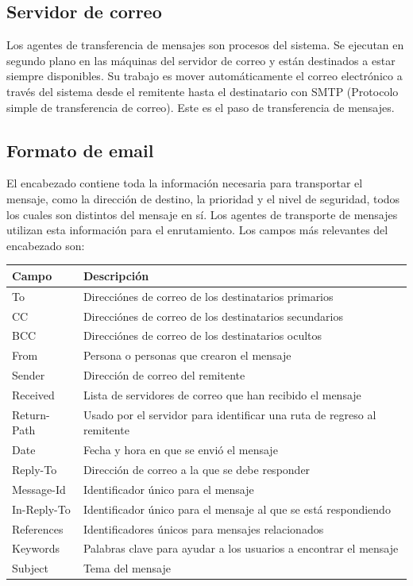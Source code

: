 \subsection{Servidor de correo}
Los agentes de transferencia de mensajes son procesos del sistema. Se ejecutan en segundo plano en las máquinas del servidor de correo y están destinados a estar siempre disponibles. Su trabajo es mover automáticamente el correo electrónico a través del sistema desde el remitente hasta el destinatario con SMTP (Protocolo simple de transferencia de correo). Este es el paso de transferencia de mensajes.

\subsection{Formato de email}
El encabezado contiene toda la información necesaria para transportar el mensaje, como la dirección de destino, la prioridad y el nivel de seguridad, todos los cuales son distintos del mensaje en sí. Los agentes de transporte de mensajes utilizan esta información para el enrutamiento. Los campos más relevantes del encabezado son:
\begin{center}
  \begin{tabularx}{0.8\textwidth}{l|p{}}
    \textbf{Campo} & \textbf{Descripción} \\
    \hline
    To & Direcciónes de correo de los destinatarios primarios \\
    CC & Direcciónes de correo de los destinatarios secundarios \\
    BCC & Direcciónes de correo de los destinatarios ocultos \\
    From & Persona o personas que crearon el mensaje \\
    Sender & Dirección de correo del remitente \\
    Received & Lista de servidores de correo que han recibido el mensaje \\
    Return-Path & Usado por el servidor para identificar una ruta de regreso al remitente \\
    Date & Fecha y hora en que se envió el mensaje \\
    Reply-To & Dirección de correo a la que se debe responder \\
    Message-Id & Identificador único para el mensaje \\
    In-Reply-To & Identificador único para el mensaje al que se está respondiendo \\
    References & Identificadores únicos para mensajes relacionados \\
    Keywords & Palabras clave para ayudar a los usuarios a encontrar el mensaje \\
    Subject & Tema del mensaje \\
  \end{tabularx}
\end{center}

